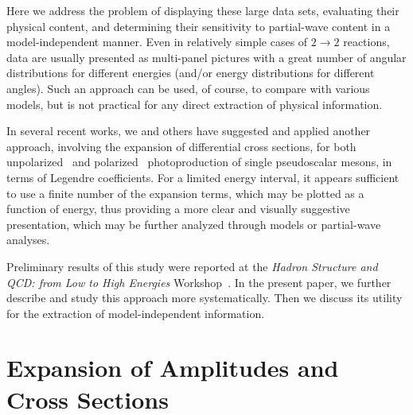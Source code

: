\documentclass[prc,reprint,onecolumn,amsmath,amssymb,superscriptaddress]{revtex4-1}
\begin{document}
Here we address the problem of displaying these large data sets,
evaluating their physical content, and determining their sensitivity 
to partial-wave content in a model-independent manner.  
Even in relatively
simple cases of $2\to2$ reactions, data are usually presented
as multi-panel pictures with a great number of angular distributions
for different energies (and/or energy distributions for different angles).
Such an approach can be used, of course, to compare with various models,
but is not practical for any direct extraction of physical information.

In several recent works, we and others have suggested and applied another approach,
involving the expansion of differential cross sections, for both
unpolarized~\cite{CBC,A2} and polarized~\cite{CLAS} photoproduction
of single pseudoscalar mesons, in terms of Legendre coefficients. For
a limited energy interval, it appears sufficient to use a finite 
number of the expansion terms, which may be plotted as a function of energy, 
thus providing a more clear and visually suggestive
presentation, which may be further analyzed through models or partial-wave
analyses.

Preliminary results of this study were reported at the \textit{Hadron 
Structure and QCD: from Low to High Energies} Workshop~\cite{YaA16}. 
In the present paper, we further describe and study this 
approach more systematically.  Then we discuss its utility for the
extraction of model-independent information.

\section{Expansion of Amplitudes and Cross Sections}
\label{sec:expan}
\end{document}
